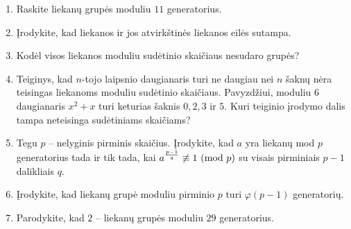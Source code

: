 \begin{enumerate}
  \item Raskite liekanų grupės moduliu $11$ generatorius.
  \item Įrodykite, kad liekanos ir jos atvirkštinės liekanos eilės sutampa.
  \item Kodėl visos liekanos moduliu sudėtinio skaičiaus nesudaro grupės?
  \item Teiginys, kad $n$-tojo laipsnio daugianaris turi ne daugiau nei $n$
    šaknų nėra teisingas liekanoms moduliu sudėtinio skaičiaus.  Pavyzdžiui,
    moduliu $6$ daugianaris $x^2 + x$ turi keturias šaknis $0, 2, 3$ ir $5$.
    Kuri teiginio įrodymo dalis tampa neteisinga sudėtiniams skaičiams?
  \item Tegu $p$ -- nelyginis pirminis skaičius. Įrodykite, kad $a$ yra
    liekanų mod $p$ generatorius tada ir tik tada, kai $a^{\frac{p-1}{q}} \not
    \equiv 1 \ (\text{mod } p)$ su visais pirminiais $p-1$ dalikliais $q$. 
  \item Įrodykite, kad liekanų grupė moduliu pirminio $p$ turi
    $\varphi(p-1)$ generatorių.
  \item Parodykite, kad $2$ -- liekanų grupės moduliu $29$ generatorius.

\end{enumerate}
